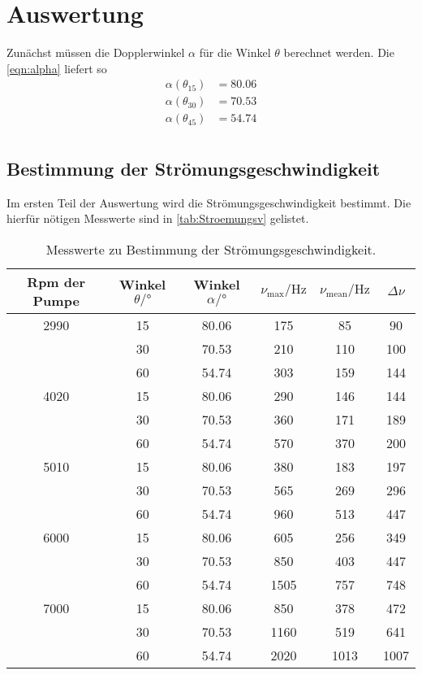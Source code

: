 \section{Auswertung}
\label{sec:Auswertung}



Zunächst müssen die Dopplerwinkel $\alpha$ für die Winkel $\theta$ berechnet werden.
Die \autoref{eqn:alpha} liefert so 
\begin{align*}
     \alpha(\theta_{15}) &= 80.06\\
     \alpha(\theta_{30}) &=70.53\\
     \alpha(\theta_{45}) &=54.74\\
\end{align*}
\subsection{Bestimmung der Strömungsgeschwindigkeit}
\label{sec:Strömungsv}
Im ersten Teil der Auswertung wird die Strömungsgeschwindigkeit bestimmt. Die hierfür nötigen Messwerte sind in \autoref{tab:Stroemungsv} gelistet.
\begin{table}
    \centering
    \caption{Messwerte zu Bestimmung der Strömungsgeschwindigkeit.}
    \begin{tabular}{c c c c c c}
        \toprule
        Rpm der Pumpe  & Winkel $\theta \mathrm{/} \unit{\degree}$ & Winkel $\alpha \mathrm{/}  \unit{\degree}$ & $\nu_{\text{max}} \mathrm{/} \unit{\hertz}$ & $\nu_{\text{mean}} \mathrm{/} \unit{\hertz}$ &  $ \Delta\nu$ \\
        \midrule
        2990 & 15 & 80.06 & 175 & 85 & 90  \\
             & 30 & 70.53 & 210 & 110 & 100 \\
             & 60 & 54.74 & 303 & 159 & 144 \\
        4020 & 15 & 80.06 & 290 & 146 & 144 \\
             & 30 & 70.53 & 360 & 171 & 189 \\
             & 60 & 54.74 & 570 & 370 & 200 \\
        5010 & 15 & 80.06 & 380 & 183 & 197 \\
             & 30 & 70.53 & 565 & 269 & 296 \\
             & 60 & 54.74 & 960 & 513 & 447 \\
        6000 & 15 & 80.06 & 605 & 256 & 349 \\
             & 30 & 70.53 & 850 & 403 & 447 \\
             & 60 & 54.74 & 1505 & 757 & 748 \\
        7000 & 15 & 80.06 & 850 & 378 & 472  \\
             & 30 & 70.53 & 1160 & 519 & 641 \\
             & 60 & 54.74 & 2020 & 1013 & 1007 \\
        \bottomrule
    \end{tabular}
    \label{tab:Stroemungsv}
\end{table}
